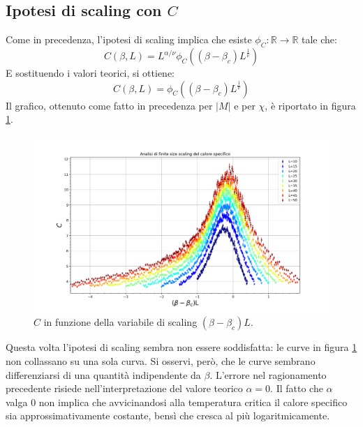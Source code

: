\documentclass[10pt,a4paper]{article}
\begin{document}
\subsection*{Ipotesi di scaling con $C$}
Come in precedenza, l'ipotesi di scaling implica che esiste $\phi_C:\mathbb{R}\rightarrow\mathbb{R}$ tale che:\\
\begin{equation*}
C(\beta,L)= L^{\alpha/\nu}\phi_C((\beta-\beta_c)L^{\frac{1}{\nu}})
\end{equation*}
E sostituendo i valori teorici, si ottiene:
\begin{equation*}
C(\beta,L)=\phi_C((\beta-\beta_c)L^{\frac{1}{\nu}})
\end{equation*}
Il grafico, ottenuto come fatto in precedenza per $|M|$ e per $\chi$, è riportato in figura \ref{fig:calspecFSS}.

\begin{figure}[h!]
	\centering
	\includegraphics[width=1\linewidth]{cal_norm}
	\caption{$C$ in funzione della variabile di scaling $(\beta-\beta_c)L$.}
	\label{fig:calspecFSS}
\end{figure}

Questa volta l'ipotesi di scaling sembra non essere soddisfatta: le curve in figura \ref{fig:calspecFSS} non collassano su una sola curva. Si osservi, però, che le curve sembrano differenziarsi di una quantità indipendente da $\beta$. L'errore nel ragionamento precedente risiede nell'interpretazione del valore teorico $\alpha=0$. Il fatto che $\alpha$ valga $0$ non implica che avvicinandosi alla temperatura critica il calore specifico sia approssimativamente costante, bensì che cresca al più logaritmicamente. 
\end{document}
